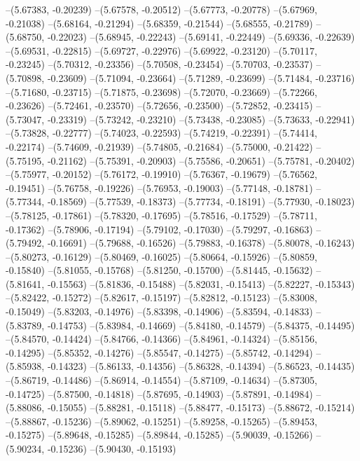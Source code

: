 --(5.67383, -0.20239)
--(5.67578, -0.20512)
--(5.67773, -0.20778)
--(5.67969, -0.21038)
--(5.68164, -0.21294)
--(5.68359, -0.21544)
--(5.68555, -0.21789)
--(5.68750, -0.22023)
--(5.68945, -0.22243)
--(5.69141, -0.22449)
--(5.69336, -0.22639)
--(5.69531, -0.22815)
--(5.69727, -0.22976)
--(5.69922, -0.23120)
--(5.70117, -0.23245)
--(5.70312, -0.23356)
--(5.70508, -0.23454)
--(5.70703, -0.23537)
--(5.70898, -0.23609)
--(5.71094, -0.23664)
--(5.71289, -0.23699)
--(5.71484, -0.23716)
--(5.71680, -0.23715)
--(5.71875, -0.23698)
--(5.72070, -0.23669)
--(5.72266, -0.23626)
--(5.72461, -0.23570)
--(5.72656, -0.23500)
--(5.72852, -0.23415)
--(5.73047, -0.23319)
--(5.73242, -0.23210)
--(5.73438, -0.23085)
--(5.73633, -0.22941)
--(5.73828, -0.22777)
--(5.74023, -0.22593)
--(5.74219, -0.22391)
--(5.74414, -0.22174)
--(5.74609, -0.21939)
--(5.74805, -0.21684)
--(5.75000, -0.21422)
--(5.75195, -0.21162)
--(5.75391, -0.20903)
--(5.75586, -0.20651)
--(5.75781, -0.20402)
--(5.75977, -0.20152)
--(5.76172, -0.19910)
--(5.76367, -0.19679)
--(5.76562, -0.19451)
--(5.76758, -0.19226)
--(5.76953, -0.19003)
--(5.77148, -0.18781)
--(5.77344, -0.18569)
--(5.77539, -0.18373)
--(5.77734, -0.18191)
--(5.77930, -0.18023)
--(5.78125, -0.17861)
--(5.78320, -0.17695)
--(5.78516, -0.17529)
--(5.78711, -0.17362)
--(5.78906, -0.17194)
--(5.79102, -0.17030)
--(5.79297, -0.16863)
--(5.79492, -0.16691)
--(5.79688, -0.16526)
--(5.79883, -0.16378)
--(5.80078, -0.16243)
--(5.80273, -0.16129)
--(5.80469, -0.16025)
--(5.80664, -0.15926)
--(5.80859, -0.15840)
--(5.81055, -0.15768)
--(5.81250, -0.15700)
--(5.81445, -0.15632)
--(5.81641, -0.15563)
--(5.81836, -0.15488)
--(5.82031, -0.15413)
--(5.82227, -0.15343)
--(5.82422, -0.15272)
--(5.82617, -0.15197)
--(5.82812, -0.15123)
--(5.83008, -0.15049)
--(5.83203, -0.14976)
--(5.83398, -0.14906)
--(5.83594, -0.14833)
--(5.83789, -0.14753)
--(5.83984, -0.14669)
--(5.84180, -0.14579)
--(5.84375, -0.14495)
--(5.84570, -0.14424)
--(5.84766, -0.14366)
--(5.84961, -0.14324)
--(5.85156, -0.14295)
--(5.85352, -0.14276)
--(5.85547, -0.14275)
--(5.85742, -0.14294)
--(5.85938, -0.14323)
--(5.86133, -0.14356)
--(5.86328, -0.14394)
--(5.86523, -0.14435)
--(5.86719, -0.14486)
--(5.86914, -0.14554)
--(5.87109, -0.14634)
--(5.87305, -0.14725)
--(5.87500, -0.14818)
--(5.87695, -0.14903)
--(5.87891, -0.14984)
--(5.88086, -0.15055)
--(5.88281, -0.15118)
--(5.88477, -0.15173)
--(5.88672, -0.15214)
--(5.88867, -0.15236)
--(5.89062, -0.15251)
--(5.89258, -0.15265)
--(5.89453, -0.15275)
--(5.89648, -0.15285)
--(5.89844, -0.15285)
--(5.90039, -0.15266)
--(5.90234, -0.15236)
--(5.90430, -0.15193)

